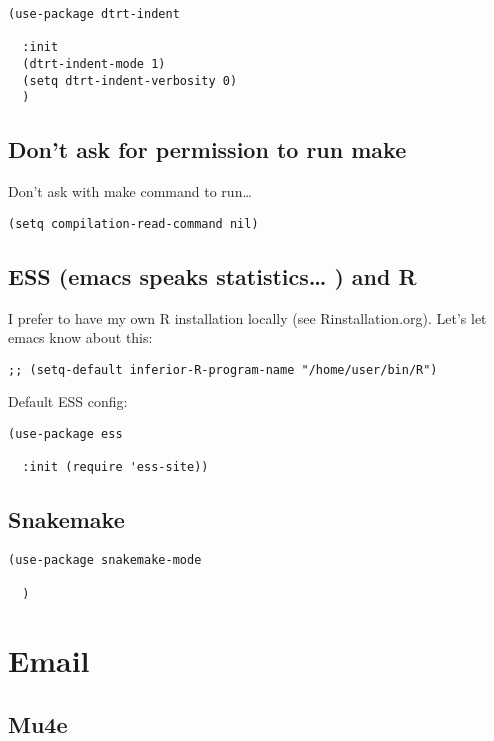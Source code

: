 \documentclass[12pt]{article}
\begin{document}
\begin{verbatim}
(use-package dtrt-indent 

  :init 
  (dtrt-indent-mode 1)
  (setq dtrt-indent-verbosity 0)
  )
\end{verbatim}

\subsection{Don't ask for permission to run make}
\label{sec:org80e5d85}
Don't ask with make command to run\ldots{}
\begin{verbatim}
(setq compilation-read-command nil)
\end{verbatim}

\subsection{ESS  (emacs speaks statistics\ldots{} ) and R}
\label{sec:orgeedb7cc}

I prefer to have my own R installation locally (see Rinstallation.org). Let's let emacs know about this: 

\begin{verbatim}
;; (setq-default inferior-R-program-name "/home/user/bin/R")
\end{verbatim}

Default ESS config: 
\begin{verbatim}
(use-package ess

  :init (require 'ess-site))
\end{verbatim}

\subsection{Snakemake}
\label{sec:org69e1a3b}
\begin{verbatim}
(use-package snakemake-mode

  )
\end{verbatim}

\section{Email}
\label{sec:orgb5b7735}


\subsection{Mu4e}
\label{sec:org12ed89f}
\end{document}
